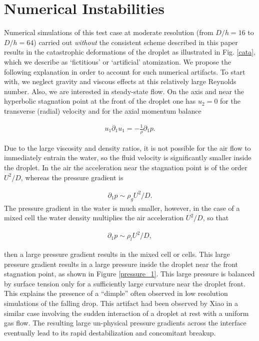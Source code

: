 \section{Numerical Instabilities}

Numerical simulations of this test case at moderate resolution 
(from $D/h=16$ to $D/h=64$) carried out \textit{without} the 
consistent scheme described in this paper results in the catastrophic 
deformations of the droplet as illustrated in Fig. \ref{cata}, 
which we describe as `fictitious' or `artificial' atomization. 
We propose the following explanation in order to account for such numerical artifacts. 
To start with, we neglect gravity and viscous effects at this relatively large Reynolds number. 
Also, we are interested in steady-state flow. 
On the axis and near the hyperbolic stagnation point 
at the front of the droplet one has $u_2=0$ for the transverse 
(radial) velocity and for the axial momentum balance


\begin{align}
u_1 \partial_1 u_1 = - \frac 1 \rho \partial_1 p.
\end{align}

Due to the large viscosity and density ratios, it is not possible for 
the air flow to immediately entrain the water, so the fluid velocity 
is significantly smaller inside the droplet. 
In the air the acceleration near the stagnation point is 
of the order $U^2/D$, whereas the pressure gradient is

\begin{align}
\partial_1 p \sim \rho_{g} U^2/D.
\end{align}
The pressure gradient in the water is much smaller, 
however, in the case of a mixed cell the water density 
multiplies the air acceleration $U^2/D$, so that

\begin{align}
\partial_1 p \sim \rho_{l} U^2/D,
\end{align}

then a large pressure gradient results in the mixed cell or cells. 
This large pressure gradient results in a large pressure inside the 
droplet near the front stagnation point, as shown in Figure \ref{pressure_1}. 
This large pressure is balanced by surface tension only for a sufficiently 
large curvature near the droplet front. 
This explains the presence of a ``dimple'' often observed in low 
resolution simulations of the falling drop. 
This artifact had been observed by Xiao \cite{xiao2012} in a similar case 
involving the sudden interaction of a droplet at rest with a uniform gas flow. 
The resulting large un-physical pressure gradients across the interface 
eventually lead to its rapid destabilization and concomitant breakup.  

